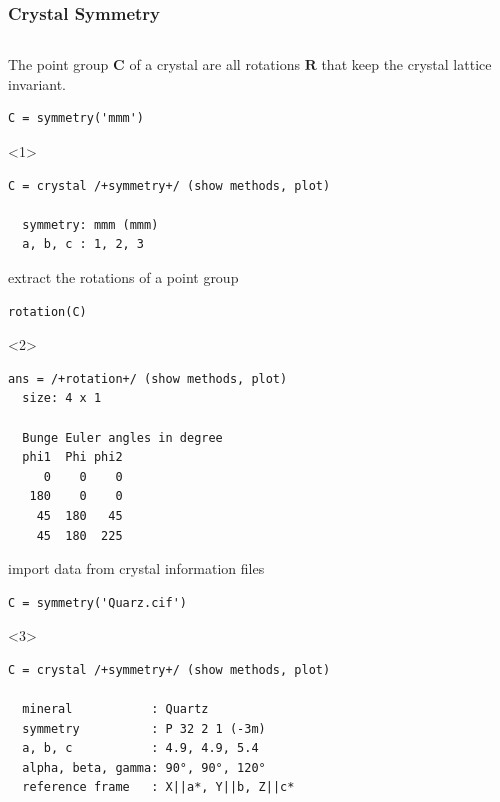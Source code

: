 \documentclass[compress]{beamer}
\begin{document}
\begin{frame}
  \frametitle{Crystal Symmetry}

  \begin{columns}
  \begin{column}{8cm}

    \begin{overlayarea}{8cm}{8cm}
      The \alert{point group} $\mathbf C$ of a crystal are all rotations
      $\mathbf R$ that keep the crystal lattice invariant.

\begin{lstlisting}[style=input]
C = symmetry('mmm')
\end{lstlisting}
    \begin{onlyenv}<1>
\vspace{-.3cm}\begin{lstlisting}[style=output]
C = crystal /+symmetry+/ (show methods, plot)

  symmetry: mmm (mmm)
  a, b, c : 1, 2, 3
\end{lstlisting}
    \end{onlyenv}


    \pause \medskip

    extract the rotations of a point group
\begin{lstlisting}[style=input]
 rotation(C)
\end{lstlisting}
    \begin{onlyenv}<2>
\vspace{-.3cm}\begin{lstlisting}[style=output]
  ans = /+rotation+/ (show methods, plot)
  size: 4 x 1

  Bunge Euler angles in degree
  phi1  Phi phi2
     0    0    0
   180    0    0
    45  180   45
    45  180  225
\end{lstlisting}
    \end{onlyenv}

    \pause \medskip

    import data from crystal information files
\begin{lstlisting}[style=input]
C = symmetry('Quarz.cif')
\end{lstlisting}
    \begin{onlyenv}<3>
\vspace{-.3cm}\begin{lstlisting}[style=output]
C = crystal /+symmetry+/ (show methods, plot)

  mineral           : Quartz
  symmetry          : P 32 2 1 (-3m)
  a, b, c           : 4.9, 4.9, 5.4
  alpha, beta, gamma: 90°, 90°, 120°
  reference frame   : X||a*, Y||b, Z||c*
\end{lstlisting}
    \end{onlyenv}


\end{overlayarea}
\end{column}
\end{columns}
\end{frame}
\end{document}

